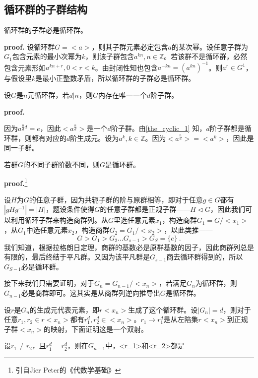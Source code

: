 \subsection{循环群的子群结构}
\begin{theorem}{}\label{the_cyclic_1}
循环群的子群必是循环群。
\end{theorem}
\textbf{proof.}
设循环群$G=<a>$，则其子群元素必定包含$a$的某次幂。设任意子群为$G_1$包含元素的最小次幂为$k$，则该子群包含$a^{kn},n\in \mathbb Z$。若该群不是循环群，必然包含元素形如$a^{kn+r},0<r<k$。由封闭性知也包含$a^{-kn}=(a^{kn})^{-1}$。则$a^{r}\in G^{1}$，与假设里$k$是最小正整数矛盾，所以循环群的子群必是循环群。
\begin{theorem}{}
设$G$是$n$元循环群，若$d|n$，则$G$内存在唯一一个$d$阶子群。
\end{theorem}
\textbf{proof.}

因为$a^{\frac{n}{d}d}=e$，因此$<a^{\frac{n}{d}}>$是一个$d$阶子群。由\autoref{the_cyclic_1} 知，$d$阶子群都是循环群，则都有对应的$d$阶生成元。设为$a^{k},k\in\mathbb Z$。因为$<a^{\frac{n}{d}}>=<a^k>$，因此是同一子群。
\begin{theorem}{}
若群$G$的不同子群阶数不同，则$G$是循环群。
\end{theorem}
\textbf{proof.}\footnote{引自Jier Peter的《代数学基础》}

设$H$为$G$的任意子群，因为共轭子群的阶与原群相等，即对于任意$g\in G$都有$|gHg^{-1}|=|H|$，题设条件使得$G$的任意子群都是正规子群——$H\lhd G$，因此我们可以利用循环子群来构造商群列。从$G$里选任意元素$x_1$，构造商群$G_1=G/<x_1>$，从$G_1$中选任意元素$x_2$，构造商群$G_2=G_1/<x_2>$，以此类推——
\begin{equation}
G>G_1>G_2...G_{s-1}>G_S=\{e\}~.
\end{equation}
我们知道，根据拉格朗日定理，商群的基数必是原群基数的因子，因此商群列总是有限的，最后终结于平凡群。又因为该平凡群是$G_{s-1}$商去循环群得到的，所以$G_{S-1}$必是循环群。

接下来我们只需要证明，对于$G_{n}=G_{n-1}/<x_n>$，若满足$G_{n}$为循环群，则$G_{n-1}$必是商群即可。这其实是从商群列逆向推导出$G$是循环群。

设$r$是$G_n$的生成元代表元素，即$r<x_n>$生成了这个循环群。设$|G_{n}|=d$，则对于任意$r_1,r_2\in r<x_n>$都有$r_1^d,r_2^d\in<x_n>$。$r_1\rightarrow r_1^d$是从左陪集$r<x_n>$到正规子群$<x_n>$的映射，下面证明这是一个双射。

设$r_1\neq r_2$，且$r_1^d=r_2^d$，则在$G_{n-1}$中，<r_1>和<r_2>都是